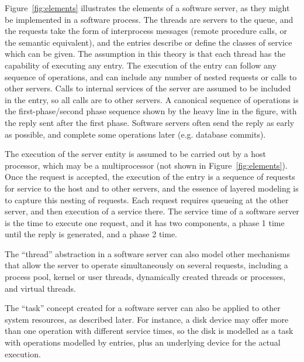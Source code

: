\documentclass[11pt]{article}
\begin{document}
Figure~\ref{fig:elements} illustrates the elements of a software
server, as they might be implemented in a software process. The
threads are servers to the queue, and the requests take the form of
interprocess messages (remote procedure calls, or the semantic
equivalent), and the entries describe or define the classes of service
which can be given. The assumption in this theory is that each thread
has the capability of executing any entry.  The execution of the entry
can follow any sequence of operations, and can include any number of
nested requests or calls to other servers. Calls to internal services
of the server are assumed to be included in the entry, so all calls
are to other servers. A canonical sequence of operations is the
first-phase/second phase sequence shown by the heavy line in the
figure, with the reply sent after the first phase. Software servers
often send the reply as early as possible, and complete some
operations later (e.g. database commits).

The execution of the server entity is assumed to be carried out by a host processor, which may
be a multiprocessor (not shown in Figure~\ref{fig:elements}). Once the request is accepted, the
execution of the entry is a sequence of requests for service to the host and to other servers, and the essence of layered modeling is to capture this 
nesting of requests. Each request requires queueing at the other server, and then execution of a 
service there. The service time of a software server is the time to execute one request, and it has two 
components, a phase 1 time until the reply is generated, and a phase 2 time.

The ``thread'' abstraction in a software server can also model other mechanisms that allow the
server to operate simultaneously on several requests, including a process pool, kernel or user
threads, dynamically created threads or processes, and virtual threads.

The ``task'' concept created for a software server can also be applied to other system resources,
as described later. For instance, a disk device may offer more than one operation with different
service times, so the disk is modelled as a task with operations modelled by entries, plus an
underlying device for the actual execution.
\end{document}
